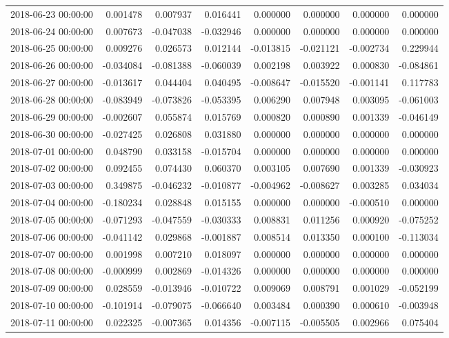 \begin{tabular}{lrrrrrrr}
2018-06-23 00:00:00 & 0.001478 & 0.007937 & 0.016441 & 0.000000 & 0.000000 & 0.000000 & 0.000000 \\
2018-06-24 00:00:00 & 0.007673 & -0.047038 & -0.032946 & 0.000000 & 0.000000 & 0.000000 & 0.000000 \\
2018-06-25 00:00:00 & 0.009276 & 0.026573 & 0.012144 & -0.013815 & -0.021121 & -0.002734 & 0.229944 \\
2018-06-26 00:00:00 & -0.034084 & -0.081388 & -0.060039 & 0.002198 & 0.003922 & 0.000830 & -0.084861 \\
2018-06-27 00:00:00 & -0.013617 & 0.044404 & 0.040495 & -0.008647 & -0.015520 & -0.001141 & 0.117783 \\
2018-06-28 00:00:00 & -0.083949 & -0.073826 & -0.053395 & 0.006290 & 0.007948 & 0.003095 & -0.061003 \\
2018-06-29 00:00:00 & -0.002607 & 0.055874 & 0.015769 & 0.000820 & 0.000890 & 0.001339 & -0.046149 \\
2018-06-30 00:00:00 & -0.027425 & 0.026808 & 0.031880 & 0.000000 & 0.000000 & 0.000000 & 0.000000 \\
2018-07-01 00:00:00 & 0.048790 & 0.033158 & -0.015704 & 0.000000 & 0.000000 & 0.000000 & 0.000000 \\
2018-07-02 00:00:00 & 0.092455 & 0.074430 & 0.060370 & 0.003105 & 0.007690 & 0.001339 & -0.030923 \\
2018-07-03 00:00:00 & 0.349875 & -0.046232 & -0.010877 & -0.004962 & -0.008627 & 0.003285 & 0.034034 \\
2018-07-04 00:00:00 & -0.180234 & 0.028848 & 0.015155 & 0.000000 & 0.000000 & -0.000510 & 0.000000 \\
2018-07-05 00:00:00 & -0.071293 & -0.047559 & -0.030333 & 0.008831 & 0.011256 & 0.000920 & -0.075252 \\
2018-07-06 00:00:00 & -0.041142 & 0.029868 & -0.001887 & 0.008514 & 0.013350 & 0.000100 & -0.113034 \\
2018-07-07 00:00:00 & 0.001998 & 0.007210 & 0.018097 & 0.000000 & 0.000000 & 0.000000 & 0.000000 \\
2018-07-08 00:00:00 & -0.000999 & 0.002869 & -0.014326 & 0.000000 & 0.000000 & 0.000000 & 0.000000 \\
2018-07-09 00:00:00 & 0.028559 & -0.013946 & -0.010722 & 0.009069 & 0.008791 & 0.001029 & -0.052199 \\
2018-07-10 00:00:00 & -0.101914 & -0.079075 & -0.066640 & 0.003484 & 0.000390 & 0.000610 & -0.003948 \\
2018-07-11 00:00:00 & 0.022325 & -0.007365 & 0.014356 & -0.007115 & -0.005505 & 0.002966 & 0.075404 \\

\end{tabular}
